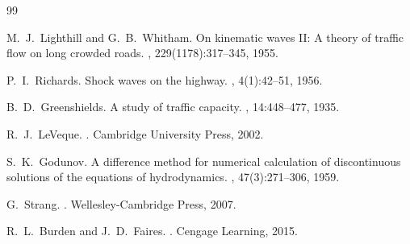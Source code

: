 \documentclass[12pt,a4paper]{ctexart}
\begin{document}
\begin{thebibliography}{99}

M.~J.~Lighthill and G.~B.~Whitham.
\newblock On kinematic waves {II}: A theory of traffic flow on long crowded roads.
, 229(1178):317--345, 1955.

P.~I.~Richards.
\newblock Shock waves on the highway.
, 4(1):42--51, 1956.

B.~D.~Greenshields.
\newblock A study of traffic capacity.
, 14:448--477, 1935.

R.~J.~LeVeque.
.
\newblock Cambridge University Press, 2002.

S.~K.~Godunov.
\newblock A difference method for numerical calculation of discontinuous solutions of the equations of hydrodynamics.
, 47(3):271--306, 1959.

G.~Strang.
.
\newblock Wellesley-Cambridge Press, 2007.

R.~L.~Burden and J.~D.~Faires.
.
\newblock Cengage Learning, 2015.

\end{thebibliography}
\end{document}
